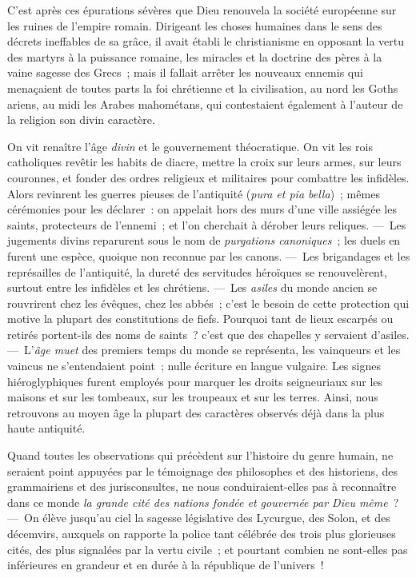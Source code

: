 \documentclass[french,twoside]{book} %
\begin{document}
\par
C’est après ces épurations sévères que Dieu renouvela la société européenne sur les ruines de l’empire romain. Dirigeant les choses humaines dans le sens des décrets ineffables de sa grâce, il avait établi le christianisme en opposant la vertu des martyrs à la puissance romaine, les miracles et la doctrine des pères à la vaine sagesse des Grecs ; mais il fallait arrêter les nouveaux ennemis qui menaçaient de toutes parts la foi chrétienne et la civilisation, au nord les Goths ariens, au midi les Arabes mahométans, qui contestaient également à l’auteur de la religion son divin caractère.\par
On vit renaître l’âge {\itshape divin} et le gouvernement théocratique. On vit les rois catholiques revêtir les habits de diacre, mettre la croix sur leurs armes, sur leurs couronnes, et fonder des ordres religieux et militaires pour combattre les infidèles. Alors revinrent les guerres pieuses de l’antiquité ({\itshape pura et pia bella}) ; mêmes cérémonies pour les déclarer : on appelait hors des murs d’une ville assiégée les saints, protecteurs de l’ennemi ; et l’on cherchait à dérober leurs reliques. — Les jugements divins reparurent sous le nom de {\itshape purgations canoniques} ; les duels en furent une espèce, quoique non reconnue par les canons. — Les brigandages et les représailles  de l’antiquité, la dureté des servitudes héroïques se renouvelèrent, surtout entre les infidèles et les chrétiens. — Les {\itshape asiles} du monde ancien se rouvrirent chez les évêques, chez les abbés ; c’est le besoin de cette protection qui motive la plupart des constitutions de fiefs. Pourquoi tant de lieux escarpés ou retirés portent-ils des noms de saints ? c’est que des chapelles y servaient d’asiles. — L’{\itshape âge muet} des premiers temps du monde se représenta, les vainqueurs et les vaincus ne s’entendaient point ; nulle écriture en langue vulgaire. Les signes hiéroglyphiques furent employés pour marquer les droits seigneuriaux sur les maisons et sur les tombeaux, sur les troupeaux et sur les terres. Ainsi, nous retrouvons au moyen âge la plupart des caractères observés déjà dans la plus haute antiquité.\par
\par
Quand toutes les observations qui précèdent sur l’histoire du genre humain, ne seraient point appuyées par le témoignage des philosophes et des historiens, des grammairiens et des jurisconsultes, ne nous conduiraient-elles pas à reconnaître dans ce monde {\itshape la grande cité des nations fondée et gouvernée par Dieu même} ? — On élève jusqu’au ciel la sagesse législative des Lycurgue, des Solon, et des décemvirs, auxquels on rapporte la police tant célébrée des trois plus glorieuses cités, des plus signalées  par la vertu civile ; et pourtant combien ne sont-elles pas inférieures en grandeur et en durée à la république de l’univers !\par
\end{document}

